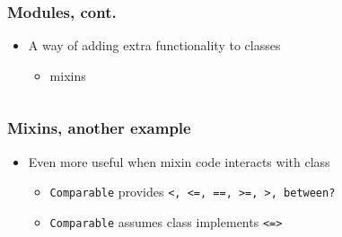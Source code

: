 \begin{frame}[fragile]\frametitle{Modules, cont.}

\begin{itemize}

\item A way of adding extra functionality to classes

\begin{itemize}
\item mixins
\end{itemize}

\end{itemize}

\pause

\begin{columns}[c]

\begin{column}{5.4cm}

\end{column}

\pause

\begin{column}{5.4cm}

\end{column}

\end{columns}

\end{frame}





\begin{frame}[fragile]\frametitle{Mixins, another example}

\begin{itemize}

\item Even more useful when mixin code interacts with class

\begin{itemize}
\item \texttt{Comparable} provides \texttt{<, <=, ==, >=, >, between?}
\item \texttt{Comparable} assumes class implements \texttt{<=>}
\end{itemize}

\end{itemize}

\pause

\begin{columns}[c]

\begin{column}{5.4cm}

\end{column}

\pause

\begin{column}{5.4cm}

\end{column}

\end{columns}

\end{frame}






